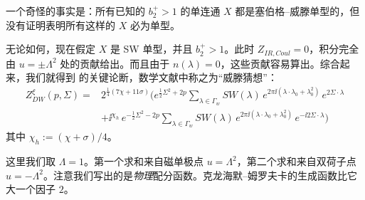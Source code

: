 一个奇怪的事实是：所有已知的 $b_2^{+}>1$ 的单连通 $X$ 都是塞伯格--威滕单型的，但没有证明表明所有这样的 $X$ 必为单型。

无论如何，现在假定 $X$ 是 SW 单型，并且 $b_2^{+}>1$。此时 $Z_{IR,Coul}=0$，积分完全由 $u=\pm\Lambda^{2}$ 处的贡献给出。而且由于 $n(\lambda)=0$，这些贡献容易算出。综合起来，我们就得到 \cite{ref55} 的关键论断，数学文献中称之为“威滕猜想”：
\begin{equation}
\begin{aligned}
Z_{DW}^{\xi}(p,\Sigma)
={}&
2^{\frac{1}{4}(7\chi+11\sigma)}
\Bigg(
e^{\frac{1}{2}\Sigma^{2}+2p}
\sum_{\lambda\in\Gamma_w}SW(\lambda)\,e^{2\pi\ii(\lambda\cdot\lambda_0+\lambda_0^{2})}\,e^{2\Sigma\cdot\lambda}\\
&+
\ii^{\chi_h}\,
e^{-\frac{1}{2}\Sigma^{2}-2p}
\sum_{\lambda\in\Gamma_w}SW(\lambda)\,e^{2\pi\ii(\lambda\cdot\lambda_0+\lambda_0^{2})}\,e^{-\ii2\Sigma\cdot\lambda}
\Bigg)
\end{aligned}
\tag{9.1}
\end{equation}
其中 $\chi_h:=(\chi+\sigma)/4$。

这里我们取 $\Lambda=1$。第一个求和来自磁单极点 $u=\Lambda^{2}$，第二个求和来自双荷子点 $u=-\Lambda^{2}$。注意我们写出的是\emph{物理}配分函数。克龙海默--姆罗夫卡的生成函数比它大一个因子 $2$。

